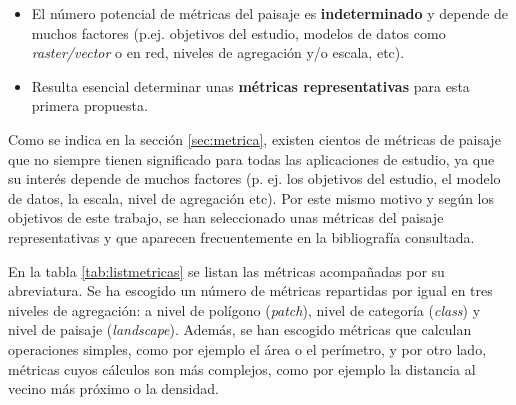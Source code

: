 \begin{graybox}
\begin{itemize}
\item El número potencial de métricas del paisaje es \textbf{indeterminado} y depende de muchos factores (p.ej. objetivos del estudio, modelos de datos como \textit{raster/vector} o en red, niveles de agregación y/o escala, etc).
\item Resulta esencial determinar unas \textbf{métricas representativas} para esta primera propuesta.
\end{itemize}
\end{graybox}

Como se indica en la sección \ref{sec:metrica}, existen cientos de métricas de paisaje que no siempre tienen significado para todas las aplicaciones de estudio, ya que su interés depende de muchos factores (p. ej. los objetivos del estudio, el modelo de datos, la escala, nivel de agregación etc). Por este mismo motivo y según los objetivos de este trabajo, se han seleccionado unas métricas del paisaje representativas y que aparecen frecuentemente en la bibliografía consultada.

En la tabla \ref{tab:listmetricas} se listan las métricas acompañadas por su abreviatura. Se ha escogido un número de métricas repartidas por igual en tres niveles de agregación: a nivel de polígono (\textit{patch}), nivel de categoría (\textit{class}) y nivel de paisaje (\textit{landscape}). Además, se han escogido métricas que calculan operaciones simples, como por ejemplo el área o el perímetro, y por otro lado, métricas cuyos cálculos son más complejos, como por ejemplo la distancia al vecino más próximo o la densidad.

